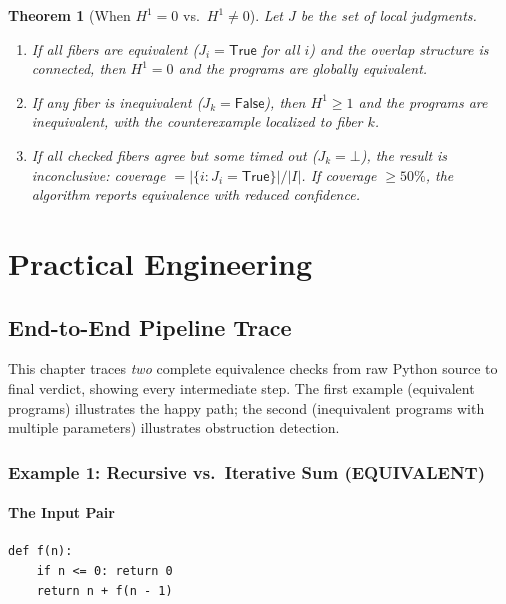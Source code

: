 \documentclass[11pt,a4paper]{report}
\theoremstyle{definition}
\theoremstyle{plain}
\newtheorem{theorem}[definition]{Theorem}
\newcommand{\Hone}{H^1}
\begin{document}
\begin{theorem}[When $\Hone = 0$ vs.\ $\Hone \neq 0$]
\label{thm:h1-interpretation}
Let $J$ be the set of local judgments.
\begin{enumerate}
  \item If all fibers are equivalent ($J_i = \mathsf{True}$
    for all $i$) and the overlap structure is connected, then
    $\Hone = 0$ and the programs are globally equivalent.
  \item If any fiber is inequivalent ($J_k = \mathsf{False}$),
    then $\Hone \geq 1$ and the programs are inequivalent, with
    the counterexample localized to fiber $k$.
  \item If all checked fibers agree but some timed out ($J_k = \bot$),
    the result is inconclusive: coverage $= |\{i : J_i =
    \mathsf{True}\}| / |I|$.  If coverage $\geq 50\%$, the
    algorithm reports equivalence with reduced confidence.
\end{enumerate}
\end{theorem}


\part{Practical Engineering}

\chapter{End-to-End Pipeline Trace}
\label{ch:e2e}

This chapter traces \emph{two} complete equivalence checks from raw
Python source to final verdict, showing every intermediate step.
The first example (equivalent programs) illustrates the happy path;
the second (inequivalent programs with multiple parameters)
illustrates obstruction detection.

\section{Example 1: Recursive vs.\ Iterative Sum (EQUIVALENT)}

\subsection{The Input Pair}

\begin{lstlisting}[caption={Program A: recursive sum}]
def f(n):
    if n <= 0: return 0
    return n + f(n - 1)
\end{lstlisting}
\end{document}
